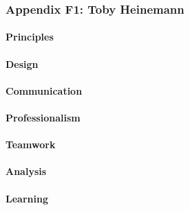\documentclass[../../main.tex]{subfiles}
\begin{document}
\subsubsection{Appendix F1: Toby Heinemann}

\paragraph{Principles}


\paragraph{Design}


\paragraph{Communication}


\paragraph{Professionalism}


\paragraph{Teamwork}


\paragraph{Analysis}


\paragraph{Learning}
\end{document}
